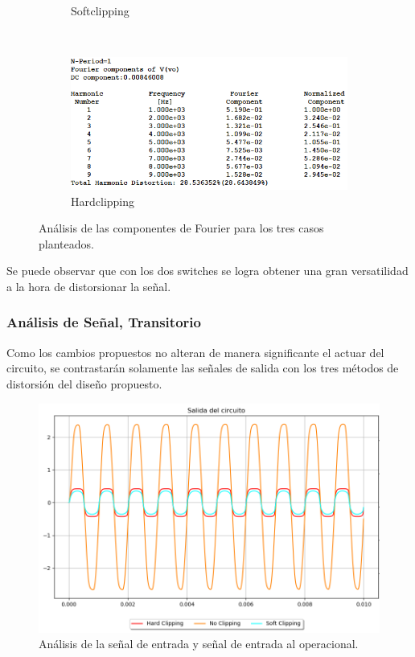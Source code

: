 \begin{figure}[H]
\begin{subfigure}[H]{0.8\textwidth}
         \caption{Softclipping}
         \label{fig:four_soft}
     \end{subfigure}
     \hfill\\
     \begin{subfigure}[H]{0.8\textwidth}
         \centering
         \includegraphics[width=\textwidth, trim={0 0 0 0}, clip]{Ejercicio5/Imagenes/Circuito_base/Sim/circuito_propuesto_fourier_hard.png}
         \caption{Hardclipping}
         \label{fig:four_hard}
     \end{subfigure}
        \caption{Análisis de las componentes de Fourier para los tres casos planteados.}
        \label{fig:four_anal}
\end{figure}

Se puede observar que con los dos switches se logra obtener una gran versatilidad a la hora de distorsionar la señal.
	
\subsubsection{Análisis de Señal, Transitorio}

Como los cambios propuestos no alteran de manera significante el actuar del circuito, se contrastarán solamente las señales de salida con los tres métodos de distorsión del diseño propuesto.

\begin{figure}[H]
	\centering
	\includegraphics[width=1\textwidth, trim={0 0 0 0}, clip]{Ejercicio5/Imagenes/Circuito_base/Sim/circuito_propuesto_salidas.png}
	\caption{Análisis de la señal de entrada y señal de entrada al operacional.}
	\label{fig:sim_prop_tran}
\end{figure}

